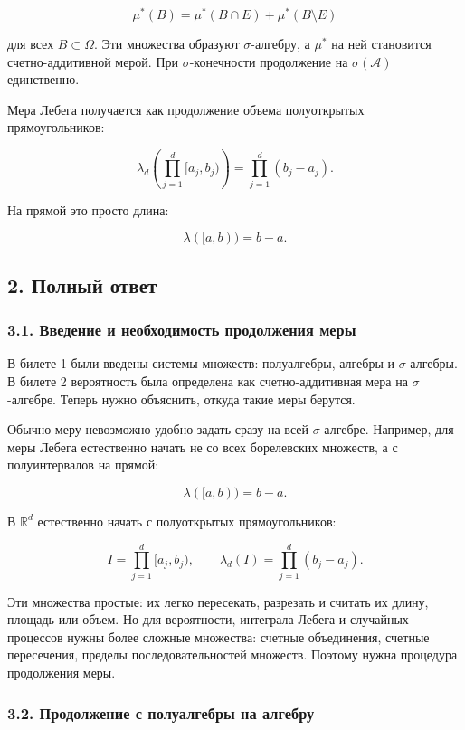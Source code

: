 \documentclass[
  11pt,
  a4paper,
]{article}
\begin{document}
\[
\mu^*(B)=\mu^*(B\cap E)+\mu^*(B\setminus E)
\]

для всех \(B\subset\Omega\). Эти множества образуют \(\sigma\)-алгебру,
а \(\mu^*\) на ней становится счетно-аддитивной мерой. При
\(\sigma\)-конечности продолжение на \(\sigma(\mathcal A)\) единственно.

Мера Лебега получается как продолжение объема полуоткрытых
прямоугольников:

\[
\lambda_d\left(\prod_{j=1}^d[a_j,b_j)\right)
=
\prod_{j=1}^d(b_j-a_j).
\]

На прямой это просто длина:

\[
\lambda([a,b))=b-a.
\]

\subsection{2. Полный
ответ}\label{ux43fux43eux43bux43dux44bux439-ux43eux442ux432ux435ux442}

\subsubsection{3.1. Введение и необходимость продолжения
меры}\label{ux432ux432ux435ux434ux435ux43dux438ux435-ux438-ux43dux435ux43eux431ux445ux43eux434ux438ux43cux43eux441ux442ux44c-ux43fux440ux43eux434ux43eux43bux436ux435ux43dux438ux44f-ux43cux435ux440ux44b}

В билете 1 были введены системы множеств: полуалгебры, алгебры и
\(\sigma\)-алгебры. В билете 2 вероятность была определена как
счетно-аддитивная мера на \(\sigma\)-алгебре. Теперь нужно объяснить,
откуда такие меры берутся.

Обычно меру невозможно удобно задать сразу на всей \(\sigma\)-алгебре.
Например, для меры Лебега естественно начать не со всех борелевских
множеств, а с полуинтервалов на прямой:

\[
\lambda([a,b))=b-a.
\]

В \(\mathbb R^d\) естественно начать с полуоткрытых прямоугольников:

\[
I=\prod_{j=1}^d[a_j,b_j),
\qquad
\lambda_d(I)=\prod_{j=1}^d(b_j-a_j).
\]

Эти множества простые: их легко пересекать, разрезать и считать их
длину, площадь или объем. Но для вероятности, интеграла Лебега и
случайных процессов нужны более сложные множества: счетные объединения,
счетные пересечения, пределы последовательностей множеств. Поэтому нужна
процедура продолжения меры.

\subsubsection{3.2. Продолжение с полуалгебры на
алгебру}\label{ux43fux440ux43eux434ux43eux43bux436ux435ux43dux438ux435-ux441-ux43fux43eux43bux443ux430ux43bux433ux435ux431ux440ux44b-ux43dux430-ux430ux43bux433ux435ux431ux440ux443}
\end{document}
